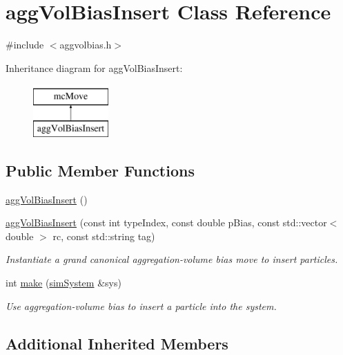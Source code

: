 \hypertarget{classagg_vol_bias_insert}{\section{agg\-Vol\-Bias\-Insert Class Reference}
\label{classagg_vol_bias_insert}
}


{\ttfamily \#include $<$aggvolbias.\-h$>$}

Inheritance diagram for agg\-Vol\-Bias\-Insert\-:\begin{figure}[H]
\begin{center}
\leavevmode
\includegraphics[height=2.000000cm]{classagg_vol_bias_insert}
\end{center}
\end{figure}
\subsection*{Public Member Functions}
\begin{DoxyCompactItemize}
\item 
\hyperlink{classagg_vol_bias_insert_a81ff1f16faebd380b1cb91720781d60a}{agg\-Vol\-Bias\-Insert} ()
\item 
\hyperlink{classagg_vol_bias_insert_ae2aaa1b3422910a395ca101a8d8aef0d}{agg\-Vol\-Bias\-Insert} (const int type\-Index, const double p\-Bias, const std\-::vector$<$ double $>$ rc, const std\-::string tag)
\begin{DoxyCompactList}\small\item\em Instantiate a grand canonical aggregation-\/volume bias move to insert particles. \end{DoxyCompactList}\item 
int \hyperlink{classagg_vol_bias_insert_a09bcb804829321579d40f84b1bfc8856}{make} (\hyperlink{classsim_system}{sim\-System} \&sys)
\begin{DoxyCompactList}\small\item\em Use aggregation-\/volume bias to insert a particle into the system. \end{DoxyCompactList}\end{DoxyCompactItemize}
\subsection*{Additional Inherited Members}


